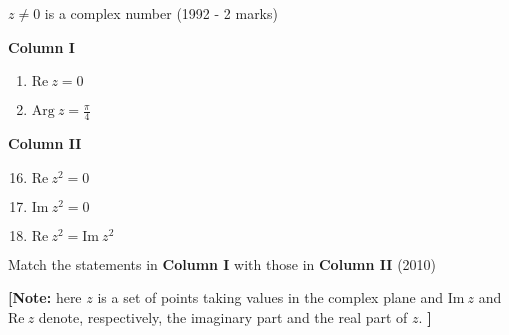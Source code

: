 \iffalse
\title{Assignment 1}
\author{AI24BTECH11031 - Shivram S}
\section{matrix-match}
\fi

	\item $z \ne 0$ is a complex number 
		\hfill (1992 - 2 marks)

		\begin{multicols}{2}
			\textbf{Column I}
			\begin{enumerate}[label=(\Alph*)]
				\item $\mathrm{Re}\ z = 0$
				\item $\mathrm{Arg}\ z = \frac{\pi}{4}$
			\end{enumerate}
			\columnbreak
			\textbf{Column II}
			\begin{enumerate}[label=(\alph*)]
					\setcounter{enumii}{15}
				\item $\mathrm{Re}\ z^2 = 0$
				\item $\mathrm{Im}\ z^2 = 0$
				\item $\mathrm{Re}\ z^2 = \mathrm{Im}\ z^2$
			\end{enumerate}
		\end{multicols}

	\item Match the statements in \textbf{Column I} with those in \textbf{Column II}
		\hfill (2010)

		\textbf{[Note:} here $z$ is a set of points taking values in the
		complex plane and $\mathrm{Im}\ z$ and $\mathrm{Re}\ z$
		denote, respectively, the imaginary part and the real part of $z$. \textbf{]}

